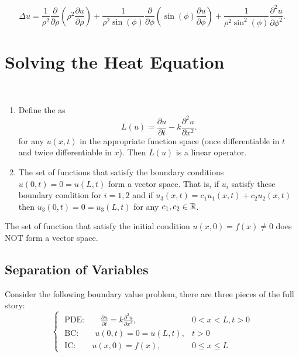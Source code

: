 \documentclass[class=article,crop=false]{standalone}
\begin{document}
\begin{thm}[Spherical]
\[
	\Delta u = \frac{1}{\rho^2} \frac{\partial }{\partial \rho} \left( \rho^2 \frac{\partial u}{\partial \rho}  \right)+ \frac{1}{\rho^2 \sin(\phi )} \frac{\partial }{\partial \phi} \left( \sin(\phi )\frac{\partial u}{\partial \phi}  \right) + \frac{1}{\rho^2 \sin^2(\phi )} \frac{\partial^2 u}{\partial { \phi}^2}  
.\] 
\end{thm}

\newpage
\section{Solving the Heat Equation}
~\begin{defn}
\begin{enumerate}[label=\arabic*)]
	\item Define the  as 
		\[
			L(u) = \frac{\partial u}{\partial t} -k \frac{\partial^2 u}{\partial { x}^2} 
		.\] 
		for any $ u(x,t)$ in the appropriate function space (once differentiable in $ t$ and twice differentiable in  $ x$).
		Then $ L(u)$ is a linear operator.
	\item The set of functions that satisfy the boundary conditions $ u(0,t)=0=u(L,t)$ form a vector space. That is, if  $ u_i$ satisfy these boundary condition for $ i=1,2$ and if $ u_3(x,t)=c_1 u_1(x,t)+ c_2 u_2(x,t)$ then $ u_3(0,t)=0=u_3(L,t) $ for any $ c_1,c_2 \in \mathbb{R}$.
\end{enumerate}
\begin{note}[]
	The set of function that satisfy the initial condition $ u(x,0)=f(x) \neq 0$ does NOT form a vector space.
\end{note}
\end{defn}

\subsection{Separation of Variables}
Consider the following boundary value problem, there are three pieces of the full story:
\begin{equation*}
\begin{cases}
	\text{ PDE:} \qquad  \frac{\partial u}{\partial t} =k\frac{\partial^2 u}{\partial { x}^2} , & 0<x<L,t>0\\
	\text{ BC:} \qquad  u(0,t)=0=u(L,t), & t>0\\
	\text{ IC:} \qquad  u(x,0) = f(x), & 0\leq x \leq L 
\end{cases}
\end{equation*}
\end{document}
